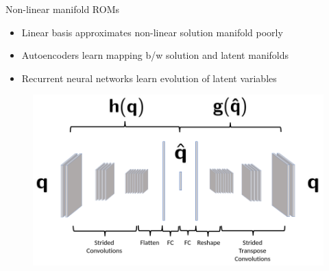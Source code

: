 \documentclass[]{beamer}
\begin{document}
\begin{frame}{Non-linear manifold ROMs\footnotemark[16]}
	\begin{itemize}
		\item Linear basis approximates non-linear solution manifold poorly
		\item Autoencoders learn mapping b/w solution and latent manifolds
		\item Recurrent neural networks learn evolution of latent variables
	\end{itemize}
	\vspace{2em}
	\begin{minipage}{0.49\linewidth}
		\begin{figure}
			\includegraphics[width=0.99\linewidth]{misc/CAE_dense.png}
		\end{figure}
	\end{minipage}
	\begin{minipage}{0.49\linewidth}
		\begin{figure}
		\end{figure}
	\end{minipage}
\end{frame}
\end{document}
